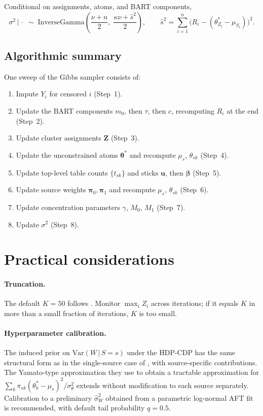 \documentclass[11pt]{article}
\theoremstyle{plain}
\theoremstyle{definition}
\theoremstyle{remark}
\newcommand{\1}{\mathds{1}}
\newcommand{\given}{\,|\,}
\newcommand{\Var}{\mathrm{Var}}
\begin{document}
Conditional on assignments, atoms, and BART components,
\begin{equation}
\sigma^2 \given \cdot \;\sim\; \mathrm{InverseGamma}\!\left(\frac{\nu + n}{2},\; \frac{\kappa\nu + \hat s^2}{2}\right), \qquad \hat s^2 = \sum_{i=1}^n \big(R_i - (\theta_{Z_i}^* - \mu_{S_i})\big)^2.
\end{equation}

\subsection{Algorithmic summary}

One sweep of the Gibbs sampler consists of:
\begin{enumerate}[label=(\arabic*), noitemsep]
\item Impute $Y_i$ for censored $i$ (Step~1).
\item Update the BART components $m_0$, then $\tau$, then $c$, recomputing $R_i$ at the end (Step~2).
\item Update cluster assignments $\bm{Z}$ (Step~3).
\item Update the unconstrained atoms $\bm{\theta}^*$ and recompute $\mu_s$, $\theta_{sk}$ (Step~4).
\item Update top-level table counts $\{t_{sk}\}$ and sticks $\bm{u}$, then $\bm{\beta}$ (Step~5).
\item Update source weights $\bm{\pi}_0, \bm{\pi}_1$ and recompute $\mu_s$, $\theta_{sk}$ (Step~6).
\item Update concentration parameters $\gamma$, $M_0$, $M_1$ (Step~7).
\item Update $\sigma^2$ (Step~8).
\end{enumerate}

\section{Practical considerations}\label{sec:practical-considerations}

\paragraph{Truncation.} The default $K = 50$ follows \citet{henderson2020individualized}. Monitor $\max_i Z_i$ across iterations; if it equals $K$ in more than a small fraction of iterations, $K$ is too small.

\paragraph{Hyperparameter calibration.} The induced prior on $\Var(W \given S = s)$ under the HDP-CDP has the same structural form as in the single-source case of \citet{henderson2020individualized}, with source-specific contributions. The Yamato-type approximation \citep{yamato1984characteristic} they use to obtain a tractable approximation for $\sum_k \pi_{sk}(\theta_k^* - \mu_s)^2 / \sigma_\theta^2$ extends without modification to each source separately. Calibration to a preliminary $\hat\sigma_W^2$ obtained from a parametric log-normal AFT fit is recommended, with default tail probability $q = 0.5$.
\end{document}
